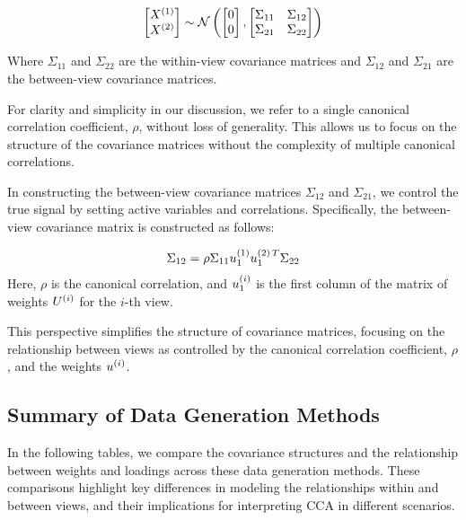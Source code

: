 \begin{align}
    \begin{bmatrix}
        X^{(1)} \\ X^{(2)}
    \end{bmatrix} \sim \mathcal{N} \left( \begin{bmatrix}
                                              0 \\ 0
    \end{bmatrix}, \begin{bmatrix}
                       \Sigma_{11} & \Sigma_{12} \\ \Sigma_{21} & \Sigma_{22}
    \end{bmatrix} \right)
\end{align}

Where \(\Sigma_{11}\) and \(\Sigma_{22}\) are the within-view covariance matrices and \(\Sigma_{12}\) and \(\Sigma_{21}\) are the between-view covariance matrices.

For clarity and simplicity in our discussion, we refer to a single canonical correlation coefficient, \(\rho\), without loss of generality.
This allows us to focus on the structure of the covariance matrices without the complexity of multiple canonical correlations.

In constructing the between-view covariance matrices \(\Sigma_{12}\) and \(\Sigma_{21}\), we control the true signal by setting active variables and correlations.
Specifically, the between-view covariance matrix is constructed as follows:

\begin{align}
    \Sigma_{12} = \rho \Sigma_{11} u^{(1)}_{1} u^{(2)\,T}_{1} \Sigma_{22}
\end{align}
%
Here, \(\rho\) is the canonical correlation, and \(u^{(i)}_{1}\) is the first column of the matrix of weights \(U^{(i)}\) for the \(i\)-th view.

This perspective simplifies the structure of covariance matrices, focusing on the relationship between views as controlled by the canonical correlation coefficient, \(\rho\), and the weights \(u^{(i)}\).

\subsection{Summary of Data Generation Methods}

In the following tables, we compare the covariance structures and the relationship between weights and loadings across these data generation methods.
These comparisons highlight key differences in modeling the relationships within and between views, and their implications for interpreting CCA in different scenarios.

